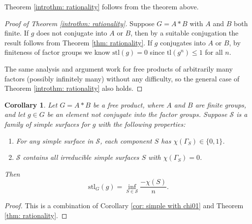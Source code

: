 \documentclass{amsart}
\newtheorem{corollary}[theorem]{Corollary}
\theoremstyle{definition}
\numberwithin{equation}{section}
\theoremstyle{theorem}
\theoremstyle{remark}
\def\tl{\mathrm{tl}}
\def\stl{\mathrm{stl}}
\begin{document}
	
	Theorem \ref{introthm: rationality} follows from the theorem above.
	\begin{proof}[Proof of Theorem \ref{introthm: rationality}]
		Suppose $G=A*B$ with $A$ and $B$ both finite. If $g$ does not conjugate into $A$ or $B$, then by a suitable conjugation the result follows from Theorem \ref{thm: rationality}. If $g$ conjugates into $A$ or $B$, by finiteness of factor groups we know $\stl(g)=0$ since $\tl(g^n)\le 1$ for all $n$.
		
		The same analysis and argument work for free products of arbitrarily many factors (possibly infinitely many) without any difficulty, so the general case of Theorem \ref{introthm: rationality} also holds.

	\end{proof}		
		
	\begin{corollary}\label{cor: intermediate families}
		Let $G=A*B$ be a free product, where $A$ and $B$ are finite groups, and let $g\in G$ be an element not conjugate into the factor groups. 
		Suppose $\mathcal{S}$ is a family of simple surfaces for $g$ with the following properties:
		\begin{enumerate}
			\item For any simple surface in $\mathcal{S}$, each component $S$ has $\chi(\Gamma_S)\in\{0,1\}$.
			\item $\mathcal{S}$ contains all irreducible simple surfaces $S$ with $\chi(\Gamma_S)=0$.
		\end{enumerate}
		 Then
		$$\stl_G(g)=\inf_{S\in \mathcal{S}}\frac{-\chi(S)}{n}.$$
	\end{corollary}
	\begin{proof}
		This is a combination of Corollary \ref{cor: simple with chi01} and Theorem \ref{thm: rationality}.
	\end{proof}
	
\end{document}
